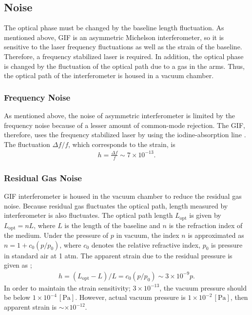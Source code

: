 \subsection{Noise}
The optical phase must be changed by the baseline length fluctuation. As mentioned above, GIF is an asymmetric Michelson interferometer, so it is sensitive to the laser frequency fluctuations as well as the strain of the baseline. Therefore, a frequency stabilized laser is required. In addition, the optical phase is changed by the fluctuation of the optical path due to a gas in the arms. Thus, the optical path of the interferometer is housed in a vacuum chamber.

\subsubsection{Frequency Noise} \label{sec:123}
As mentioned above, the noise of asymmetric interferometer is limited by the frequency noise because of a lesser amount of common-mode rejection. The GIF, therefore, uses the frequency stabilized laser by using the iodine-absorption line \cite{araya2017design}. The fluctuation $\Delta{f}/f$, which corresponds to the strain, is
\begin{eqnarray}
  h = \frac{\Delta{f}}{f} \sim 7\times10^{-13}.
\end{eqnarray}

\subsubsection{Residual Gas Noise}
GIF interferometer is housed in the vacuum chamber to reduce the residual gas noise. Because residual gas fluctuates the optical path, length measured by interferometer is also fluctuates. The optical path length $L_{\mathrm{opt}}$ is given by $L_{\mathrm{opt}}=nL$, where $L$ is the length of the baseline and $n$ is the refraction index of the medium. Under the pressure of $p$ in vacuum, the index $n$ is approximated as $n = 1 + c_0(p/p_0)$, where $c_0$ denotes the relative refractive index, $p_0$ is pressure in standard air at 1 atm. The apparent strain due to the residual pressure is given as \cite{ciddor1996refractive};
\begin{eqnarray}
  h = (L_{\mathrm{opt}}-L)/L = c_0(p/p_0) \sim 3\times10^{-9} p.
\end{eqnarray}
In order to maintain the strain sensitivity; $3\times10^{-13}$, the vacuum pressure should be below $1\times10^{-4}\,[\mathrm{Pa}]$. However, actual vacuum pressure is $1\times10^{-2}\,[\mathrm{Pa}]$, then apparent strain is $\sim\times10^{-12}$.

